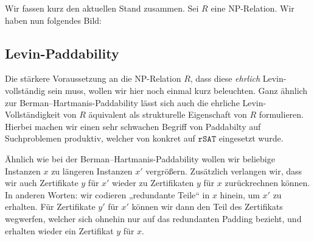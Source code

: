 Wir fassen kurz den aktuellen Stand zusammen. Sei $R$ eine NP-Relation. 
Wir haben nun folgendes Bild:

\begin{center}
\end{center}

\subsection*{Levin-Paddability}

Die stärkere Voraussetzung an die NP-Relation $R$, dass diese \emph{ehrlich} Levin-vollständig sein muss, wollen wir hier noch einmal kurz beleuchten. Ganz ähnlich zur Berman–Hartmanis-Paddability lässt sich auch die ehrliche Levin-Vollständigkeit von $R$ äquivalent als strukturelle Eigenschaft von $R$ formulieren. Hierbei machen wir einen sehr schwachen Begriff von Paddabilty auf Suchproblemen produktiv, welcher von \textcite{messner_simulation_2001} konkret auf $\mathtt{rSAT}$ eingesetzt wurde.

Ähnlich wie bei der Berman–Hartmanis-Paddability wollen wir beliebige Instanzen $x$ zu längeren Instanzen $x'$ vergrößern. Zusätzlich verlangen wir, dass wir auch Zertifikate $y$ für $x'$ wieder zu Zertifikaten $y$ für $x$ zurückrechnen können. In anderen Worten: wir codieren „redundante Teile“ in $x$ hinein, um $x'$ zu erhalten. Für Zertifikate $y'$ für $x'$ können wir dann den Teil des Zertifikats wegwerfen, welcher sich ohnehin nur auf das redundanten Padding bezieht, und erhalten wieder ein Zertifikat $y$ für $x$. 

